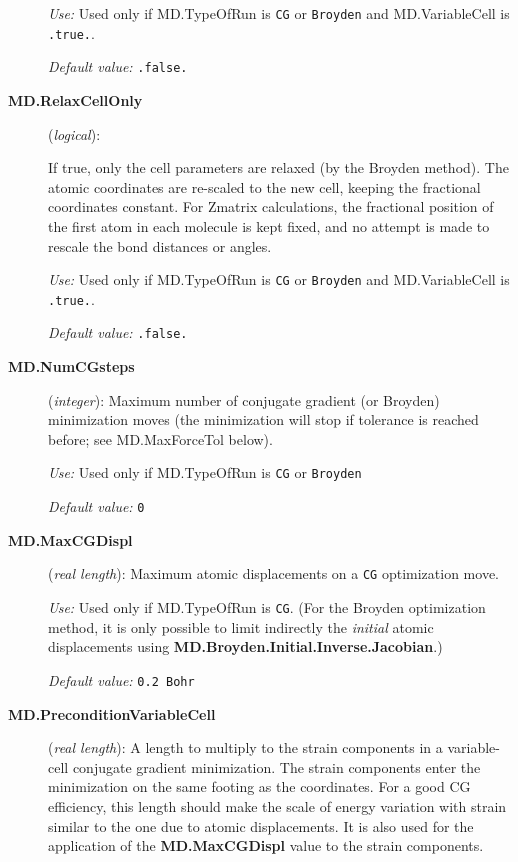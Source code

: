 \documentclass[11pt]{article}
\begin{document}
\begin{description}
{\it Use:} Used only if MD.TypeOfRun is {\tt CG} or {\tt Broyden}  and
 MD.VariableCell is
 {\tt .true.}. 

{\it Default value:} {\tt .false.}

\item[{\bf MD.RelaxCellOnly}] ({\it logical}):
  

If true, only the cell parameters are relaxed
(by the Broyden method).  The atomic coordinates are re-scaled to the
new cell, keeping the fractional coordinates constant. For Zmatrix
calculations, the fractional position of the first atom in each
molecule is kept fixed, and no attempt is made to rescale the bond
distances or angles. 

{\it Use:} Used only if MD.TypeOfRun is {\tt CG} or {\tt Broyden}  and
 MD.VariableCell is
 {\tt .true.}. 

{\it Default value:} {\tt .false.}


\item[{\bf MD.NumCGsteps}] ({\it integer}): 
Maximum number of conjugate gradient (or Broyden) minimization
moves (the minimization will stop
if tolerance is reached before; see MD.MaxForceTol below).

{\it Use:} Used only if MD.TypeOfRun is {\tt CG} or {\tt Broyden}
    
{\it Default value:} {\tt 0}

\item[{\bf MD.MaxCGDispl}] ({\it real length}): 
Maximum atomic displacements on a {\tt CG} optimization move.

{\it Use:} Used only if MD.TypeOfRun is {\tt CG}. (For the Broyden
optimization method, it is only possible to limit indirectly the {\it initial\/}
atomic displacements using {\bf MD.Broyden.Initial.Inverse.Jacobian}.)
    
{\it Default value:} {\tt 0.2 Bohr}


\item[{\bf MD.PreconditionVariableCell}] ({\it real length}):
A length to multiply to the strain components in a variable-cell conjugate
gradient minimization. The strain components enter the minimization
on the same footing as the coordinates. For a good CG efficiency, 
this length should make
the scale of energy variation with strain similar to the one 
due to atomic displacements. It is also
used for the application of the {\bf MD.MaxCGDispl} value to
the strain components.
 

\end{description}
\end{document}
